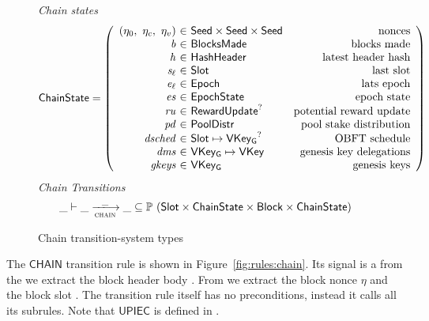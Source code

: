 \begin{figure}
  \emph{Chain states}
  \begin{equation*}
    \ChainState =
    \left(
      \begin{array}{r@{~\in~}lr}
        (\eta_0,~\eta_c,~\eta_v) & \Seed\times\Seed\times\Seed & \text{nonces} \\
        \var{b} & \BlocksMade & \text{blocks made} \\
        \var{h} & \HashHeader & \text{latest header hash} \\
        \var{s_\ell} & \Slot & \text{last slot} \\
        \var{e_\ell} & \Epoch & \text{lats epoch} \\
        \var{es} & \EpochState & \text{epoch state} \\
        \var{ru} & \RewardUpdate^? & \text{potential reward update} \\
        \var{pd} & \PoolDistr & \text{pool stake distribution} \\
        \var{dsched} & \Slot\mapsto\VKeyGen^? & \text{OBFT schedule} \\
        \var{dms} & \VKeyGen\mapsto\VKey & \text{genesis key delegations} \\
        \var{gkeys} & \VKeyGen & \text{genesis keys} \\
      \end{array}
    \right)
  \end{equation*}
  \emph{Chain Transitions}
  \begin{equation*}
    \_ \vdash \var{\_} \trans{chain}{\_} \var{\_} \subseteq
    \powerset (\Slot \times \ChainState \times \Block \times \ChainState)
  \end{equation*}
  \caption{Chain transition-system types}
  \label{fig:ts-types:chain}
\end{figure}

The $\mathsf{CHAIN}$ transition rule is shown in
Figure~\ref{fig:rules:chain}. Its signal is a  from the 
we extract the block header body . From  we extract the block
nonce $\eta$ and the block slot . The transition rule itself has no
preconditions, instead it calls all its subrules.
Note that $\mathsf{UPIEC}$ is defined in \cite{byron_ledger_spec}.

